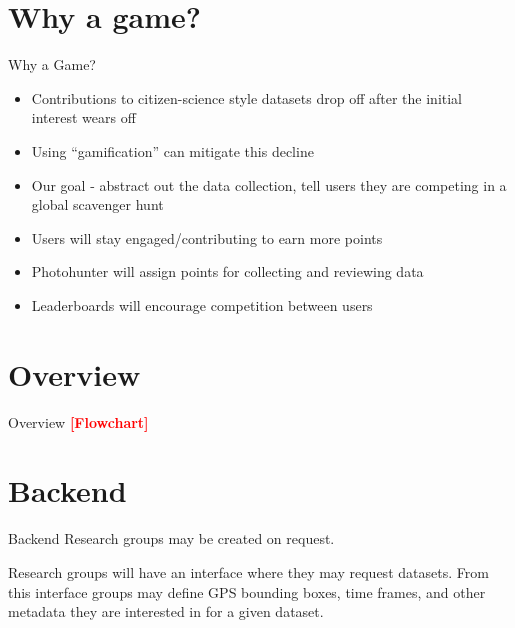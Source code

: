 \documentclass[aspectratio=169]{beamer}
\newcommand{\todo}[1]{\textcolor{red}{\textbf{[#1]}}}
\begin{document}
\section{Why a game?}

\begin{frame}{Why a Game?}
  \begin{itemize}
    
    \item Contributions to citizen-science style datasets drop off after
          the initial interest wears off
  
    \item Using ``gamification'' can mitigate this decline
  
    \item Our goal - abstract out the data collection, tell users they
          are competing in a global scavenger hunt

    \item Users will stay engaged/contributing to earn more points

    \item Photohunter will assign points for collecting and reviewing data

    \item Leaderboards will encourage competition between users

  \end{itemize}
\end{frame}

\section{Overview}

\begin{frame}{Overview}
  \todo{Flowchart}
\end{frame}

\section{Backend}

\begin{frame}{Backend}
  Research groups may be created on request. 

  Research groups will have an interface where they may request
  datasets. From this interface groups may define GPS bounding boxes,
  time frames, and other metadata they are interested in for a given
  dataset.
\end{frame}
\end{document}

